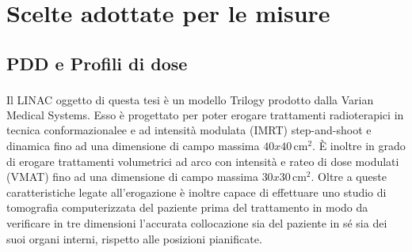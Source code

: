 \section{Scelte adottate per le misure}
\subsection{PDD e Profili di dose}
Il LINAC oggetto di questa tesi è un modello Trilogy\textsuperscript{\textcopyright} prodotto dalla Varian Medical Systems. Esso è progettato per poter erogare trattamenti radioterapici in tecnica conformazionalee e ad intensità modulata (IMRT) step-and-shoot e dinamica fino ad una dimensione di campo massima $40x40\,$cm$^2$. \`E inoltre in grado di erogare trattamenti volumetrici ad arco con intensità e rateo di dose modulati (VMAT) fino ad una dimensione di campo massima $30x30\,$cm$^2$. Oltre a queste caratteristiche legate all'erogazione è inoltre capace di effettuare uno studio di tomografia computerizzata del paziente prima del trattamento in modo da verificare in tre dimensioni l'accurata collocazione sia del paziente in sé sia dei suoi organi interni, rispetto alle posizioni pianificate.

